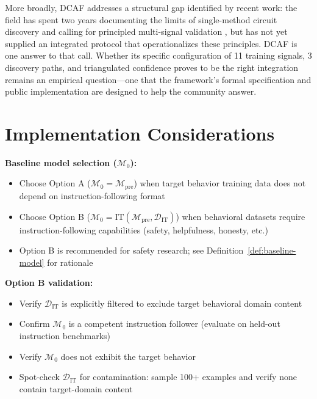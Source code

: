 \documentclass[11pt]{article}
\begin{document}
More broadly, DCAF addresses a structural gap identified by recent work: the field has spent two years documenting the limits of single-method circuit discovery \citep{meloux2025variance,zhang2024bestpractices} and calling for principled multi-signal validation \citep{sharkey2025openproblems,long2025triangulation}, but has not yet supplied an integrated protocol that operationalizes these principles. DCAF is one answer to that call. Whether its specific configuration of 11 training signals, 3 discovery paths, and triangulated confidence proves to be the right integration remains an empirical question---one that the framework's formal specification and public implementation are designed to help the community answer.







\appendix

\section{Implementation Considerations}
\label{app:implementation}

\noindent\textbf{Baseline model selection ($\mathcal{M}_0$):}
\begin{itemize}[nosep]
\item Choose Option A ($\mathcal{M}_0 = \mathcal{M}_{\text{pre}}$) when target behavior training data does not depend on instruction-following format
\item Choose Option B ($\mathcal{M}_0 = \text{IT}(\mathcal{M}_{\text{pre}}, \mathcal{D}_{\text{IT}})$) when behavioral datasets require instruction-following capabilities (safety, helpfulness, honesty, etc.)
\item Option B is recommended for safety research; see Definition~\ref{def:baseline-model} for rationale
\end{itemize}

\noindent\textbf{Option B validation:}
\begin{itemize}[nosep]
\item Verify $\mathcal{D}_{\text{IT}}$ is explicitly filtered to exclude target behavioral domain content
\item Confirm $\mathcal{M}_0$ is a competent instruction follower (evaluate on held-out instruction benchmarks)
\item Verify $\mathcal{M}_0$ does not exhibit the target behavior
\item Spot-check $\mathcal{D}_{\text{IT}}$ for contamination: sample 100+ examples and verify none contain target-domain content
\end{itemize}
\end{document}
